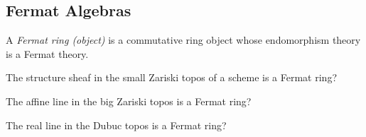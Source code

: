 {\subsection{Fermat Algebras}

\begin{definition}
  A \emph{Fermat ring (object)} is a commutative ring object whose endomorphism theory is a Fermat theory.
\end{definition}

\begin{example}
  The structure sheaf in the small Zariski topos of a scheme is a Fermat ring?
\end{example}

\begin{example}
  The affine line in the big Zariski topos is a Fermat ring?
\end{example}

\begin{example}
  The real line in the Dubuc topos is a Fermat ring?
\end{example}



}

